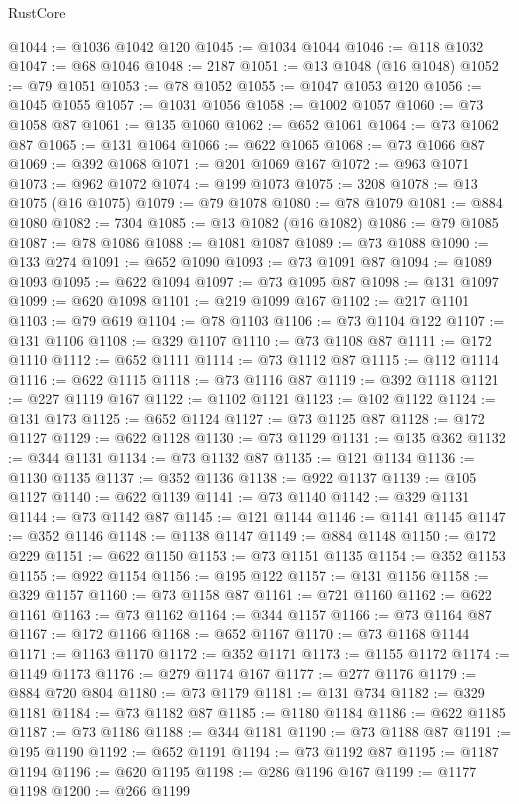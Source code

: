\begin{lexlean}{RustCore}
\begin{coremodule}
@1044 := @1036 @1042 @120
@1045 := @1034 @1044
@1046 := @118 @1032
@1047 := @68 @1046
@1048 := 2187
@1051 := @13 @1048 (@16 @1048)
@1052 := @79 @1051
@1053 := @78 @1052
@1055 := @1047 @1053 @120
@1056 := @1045 @1055
@1057 := @1031 @1056
@1058 := @1002 @1057
@1060 := @73 @1058 @87
@1061 := @135 @1060
@1062 := @652 @1061
@1064 := @73 @1062 @87
@1065 := @131 @1064
@1066 := @622 @1065
@1068 := @73 @1066 @87
@1069 := @392 @1068
@1071 := @201 @1069 @167
@1072 := @963 @1071
@1073 := @962 @1072
@1074 := @199 @1073
@1075 := 3208
@1078 := @13 @1075 (@16 @1075)
@1079 := @79 @1078
@1080 := @78 @1079
@1081 := @884 @1080
@1082 := 7304
@1085 := @13 @1082 (@16 @1082)
@1086 := @79 @1085
@1087 := @78 @1086
@1088 := @1081 @1087
@1089 := @73 @1088
@1090 := @133 @274
@1091 := @652 @1090
@1093 := @73 @1091 @87
@1094 := @1089 @1093
@1095 := @622 @1094
@1097 := @73 @1095 @87
@1098 := @131 @1097
@1099 := @620 @1098
@1101 := @219 @1099 @167
@1102 := @217 @1101
@1103 := @79 @619
@1104 := @78 @1103
@1106 := @73 @1104 @122
@1107 := @131 @1106
@1108 := @329 @1107
@1110 := @73 @1108 @87
@1111 := @172 @1110
@1112 := @652 @1111
@1114 := @73 @1112 @87
@1115 := @112 @1114
@1116 := @622 @1115
@1118 := @73 @1116 @87
@1119 := @392 @1118
@1121 := @227 @1119 @167
@1122 := @1102 @1121
@1123 := @102 @1122
@1124 := @131 @173
@1125 := @652 @1124
@1127 := @73 @1125 @87
@1128 := @172 @1127
@1129 := @622 @1128
@1130 := @73 @1129
@1131 := @135 @362
@1132 := @344 @1131
@1134 := @73 @1132 @87
@1135 := @121 @1134
@1136 := @1130 @1135
@1137 := @352 @1136
@1138 := @922 @1137
@1139 := @105 @1127
@1140 := @622 @1139
@1141 := @73 @1140
@1142 := @329 @1131
@1144 := @73 @1142 @87
@1145 := @121 @1144
@1146 := @1141 @1145
@1147 := @352 @1146
@1148 := @1138 @1147
@1149 := @884 @1148
@1150 := @172 @229
@1151 := @622 @1150
@1153 := @73 @1151 @1135
@1154 := @352 @1153
@1155 := @922 @1154
@1156 := @195 @122
@1157 := @131 @1156
@1158 := @329 @1157
@1160 := @73 @1158 @87
@1161 := @721 @1160
@1162 := @622 @1161
@1163 := @73 @1162
@1164 := @344 @1157
@1166 := @73 @1164 @87
@1167 := @172 @1166
@1168 := @652 @1167
@1170 := @73 @1168 @1144
@1171 := @1163 @1170
@1172 := @352 @1171
@1173 := @1155 @1172
@1174 := @1149 @1173
@1176 := @279 @1174 @167
@1177 := @277 @1176
@1179 := @884 @720 @804
@1180 := @73 @1179
@1181 := @131 @734
@1182 := @329 @1181
@1184 := @73 @1182 @87
@1185 := @1180 @1184
@1186 := @622 @1185
@1187 := @73 @1186
@1188 := @344 @1181
@1190 := @73 @1188 @87
@1191 := @195 @1190
@1192 := @652 @1191
@1194 := @73 @1192 @87
@1195 := @1187 @1194
@1196 := @620 @1195
@1198 := @286 @1196 @167
@1199 := @1177 @1198
@1200 := @266 @1199

\end{coremodule}
\end{lexlean}
